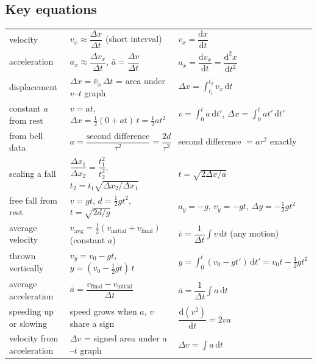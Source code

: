 \documentclass[11pt,twoside,openany]{book}
\newcommand{\dd}{\mathrm{d}}
\newcommand{\viewtag}[3]{\fcolorbox{#2}{#3}{\footnotesize\textbf{\textcolor{#2}{#1}}}}
\newcommand{\elemtag}{\viewtag{Elementary}{elemcol}{elempale}}
\newcommand{\calctag}{\viewtag{Calculus}{calccol}{calcpale}}
\begin{document}
\subsection*{Key equations}
\begin{center}
\renewcommand{\arraystretch}{2.4}
\setlength{\tabcolsep}{4pt}
\small
\begin{tabular}{lll}
\toprule
 & \elemtag & \calctag \\
\midrule
velocity & $v_x \approx \dfrac{\Delta x}{\Delta t}$ (short interval) & $v_x = \dfrac{\dd x}{\dd t}$ \\
acceleration & $a_x \approx \dfrac{\Delta v_x}{\Delta t}$, \quad $\bar a = \dfrac{\Delta v}{\Delta t}$ & $a_x = \dfrac{\dd v_x}{\dd t} = \dfrac{\dd^2 x}{\dd t^2}$ \\
displacement & $\Delta x = \bar v_x\,\Delta t$ = area under $v$--$t$ graph & $\Delta x = \displaystyle\int_{t_1}^{t_2} v_x\,\dd t$ \\
constant $a$ from rest & $v = at$, \quad $\Delta x = \tfrac12(0 + at)\,t = \tfrac12 a t^2$ & $v = \displaystyle\int_0^t a\,\dd t'$, \quad $\Delta x = \displaystyle\int_0^t at'\,\dd t'$ \\
from bell data & $a = \dfrac{\text{second difference}}{\tau^2} = \dfrac{2d}{\tau^2}$ & second difference $= a\tau^2$ exactly \\
scaling a fall & $\dfrac{\Delta x_1}{\Delta x_2} = \dfrac{t_1^2}{t_2^2}$, \quad $t_2 = t_1\sqrt{\Delta x_2/\Delta x_1}$ & $t = \sqrt{2\Delta x/a}$ \\
free fall from rest & $v = gt$, \quad $d = \tfrac12 g t^2$, \quad $t = \sqrt{2d/g}$ & $a_y = -g$, \; $v_y = -gt$, \; $\Delta y = -\tfrac12 g t^2$ \\
average velocity & $v_{\text{avg}} = \tfrac12(v_{\text{initial}} + v_{\text{final}})$ (constant $a$) & $\bar v = \dfrac{1}{\Delta t}\displaystyle\int v\,\dd t$ (any motion) \\
thrown vertically & $v_y = v_0 - gt$, \quad $y = (v_0 - \tfrac12 gt)\,t$ & $y = \displaystyle\int_0^t (v_0 - gt')\,\dd t' = v_0 t - \tfrac12 g t^2$ \\
average acceleration & $\bar a = \dfrac{v_{\text{final}} - v_{\text{initial}}}{\Delta t}$ & $\bar a = \dfrac{1}{\Delta t}\displaystyle\int a\,\dd t$ \\
speeding up or slowing & speed grows when $a$, $v$ share a sign & $\dfrac{\dd (v^2)}{\dd t} = 2va$ \\
velocity from acceleration & $\Delta v$ = signed area under $a$--$t$ graph & $\Delta v = \displaystyle\int a\,\dd t$ \\

\end{tabular}
\end{center}
\end{document}
